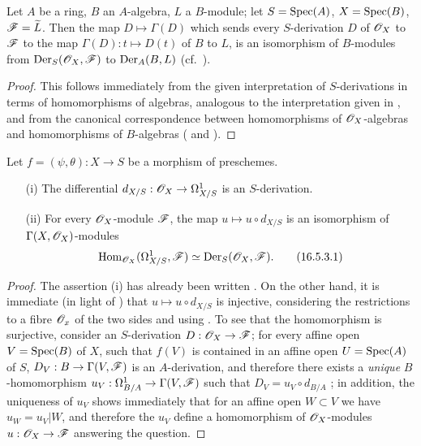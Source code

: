 \begin{proposition}[16.5.2]
\label{IV.16.5.2}
Let $A$ be a ring, $B$ an $A$-algebra, $L$ a $B$-module;
let $S = \operatorname{Spec}(A)$, $X=\operatorname{Spec}(B)$, $\mathscr{F} = \widetilde{L}$.
Then the map $D \mapsto \Gamma(D)$ which sends every $S$-derivation $D$ of $\mathscr{O}_X$ to $\mathscr{F}$ to the map $\Gamma(D) : t \mapsto D(t)$ of $B$ to $L$, is an isomorphism of $B$-modules from $\operatorname{Der}_S(\mathscr{O}_X, \mathscr{F})$ to $\operatorname{Der}_A(B, L)$ (cf.~).
\end{proposition}

\begin{proof}
This follows immediately from the given interpretation of $S$-derivations in terms
of homomorphisms of algebras, analogous to the interpretation given in , and from the canonical correspondence between homomorphisms of $\mathscr{O}_X$-algebras and homomorphisms of $B$-algebras ( and ).
\end{proof}

\begin{proposition}[16.5.3]
\label{IV.16.5.3}
Let $f = (\psi, \theta) : X \to S$ be a morphism of preschemes.
\begin{enumerate}
  \item[{\rm(i)}] The differential $d_{X/S} : \sh{O}_X \to \Omega_{X/S}^1$  is an $S$-derivation.
  \item[{\rm(ii)}] For every $\mathscr{O}_X$-module $\mathscr{F}$, the map $u \mapsto u \circ d_{X/S}$ is an isomorphism of $\Gamma(X, \mathscr{O}_X)$-modules
  \[
  \label{IV.16.5.3.1}
    \operatorname{Hom}_{\mathscr{O}_X}(\Omega_{X/S}^1, \mathscr{F}) \simeq \operatorname{Der}_S(\mathscr{O}_X, \mathscr{F}).
    \tag{16.5.3.1}
  \]
\end{enumerate}
\end{proposition}

\begin{proof}
The assertion (i) has already been written .
On the other hand, it is immediate (in light of ) that $u \mapsto u\circ d_{X/S}$ is injective, considering the restrictions to a fibre $\mathscr{O}_x$ of the two sides and using .
To see that the homomorphism  is surjective, consider an $S$-derivation $D : \sh{O}_X \to \sh{F}$;
for every affine open $V = \operatorname{Spec}(B)$ of $X$, such that $f(V)$ is contained in an affine open $U = \operatorname{Spec}(A)$ of $S$, $D_V : B \to \Gamma(V, \sh{F}) $ is an $A$-derivation, and therefore there exists a \emph{unique} $B$-homomorphism $u_V : \Omega_{B/A}^1 \to \Gamma(V, \sh{F})$ such that $D_V = u_V \circ d_{B/A}$ ;
in addition, the uniqueness of $u_V$ shows immediately that for an affine open $W \subset V$ we have $u_W = u_V|W$, and therefore the $u_V$ define a homomorphism of $\mathscr{O}_X$-modules $u : \sh{O}_X \to \sh{F}$ answering the question.
\end{proof}

